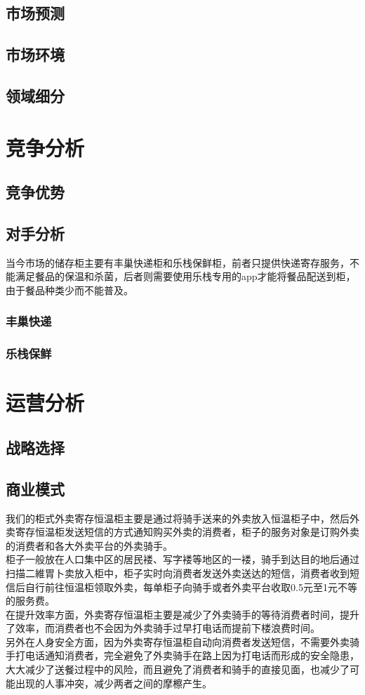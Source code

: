\documentclass[violet]{main}
\begin{document}
		\section{市场预测}
		\section{市场环境}
		\section{领域细分}	
	\chapter{竞争分析}
		\section{竞争优势}
		\section{对手分析}
			当今市场的储存柜主要有丰巢快递柜和乐栈保鲜柜，前者只提供快递寄存服务，不能满足餐品的保温和杀菌，后者则需要使用乐栈专用的app才能将餐品配送到柜，由于餐品种类少而不能普及。
			\subsection{丰巢快递}
			\subsection{乐栈保鲜}
	\chapter{运营分析}
		\section{战略选择}
		\section{商业模式}
			我们的柜式外卖寄存恒温柜主要是通过将骑手送来的外卖放入恒温柜子中，然后外卖寄存恒温柜发送短信的方式通知购买外卖的消费者，柜子的服务对象是订购外卖的消费者和各大外卖平台的外卖骑手。
			\\\indent 柜子一般放在人口集中区的居民褛、写字褛等地区的一褛，骑手到达目的地后通过扫描二維胃卜卖放入柜中，柜子实时向消费者发送外卖送达的短信，消费者收到短信后自行前往恒温柜领取外卖，每单柜子向骑手或者外卖平台收取0.5元至1元不等的服务费。
			\\\indent 在提升效率方面，外卖寄存恒温柜主要是减少了外卖骑手的等待消费者时间，提升了效率，而消费者也不会因为外卖骑手过早打电话而提前下楼浪费时间。
			\\\indent 另外在人身安全方面，因为外卖寄存恒温柜自动向消费者发送短信，不需要外卖骑手打电话通知消费者，完全避免了外卖骑手在路上因为打电话而形成的安全隐患，大大减少了送餐过程中的风险，而且避免了消费者和骑手的直接见面，也减少了可能出现的人事冲突，减少两者之间的摩檫产生。
\end{document}
